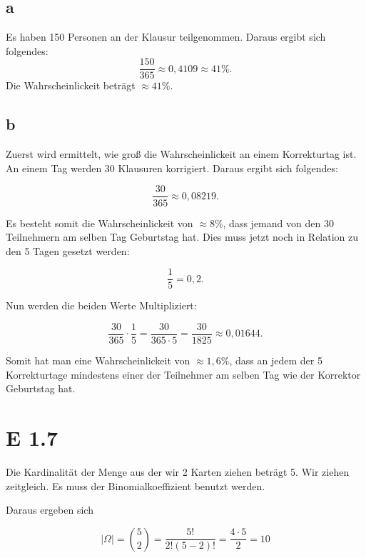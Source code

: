 \documentclass[12pt]{article}
\begin{document}
\subsection*{a}
Es haben 150 Personen an der Klausur teilgenommen. Daraus ergibt sich folgendes:
\begin{equation*}
\frac{150}{365} \approx 0,4109 \approx 41 \%.
\end{equation*}
Die Wahrscheinlickeit beträgt $\approx 41\%$.

\subsection*{b}
Zuerst wird ermittelt, wie groß die Wahrscheinlickeit an einem Korrekturtag ist. An einem Tag werden
30 Klausuren korrigiert. Daraus ergibt sich folgendes:

\begin{equation*}
\frac{30}{365} \approx 0,08219. 
\end{equation*}

Es besteht somit die Wahrscheinlickeit von $\approx 8\%$, dass jemand von den 30 Teilnehmern am
selben Tag Geburtstag hat. Dies muss jetzt noch in Relation zu den 5 Tagen gesetzt werden:

\begin{equation*}
\frac{1}{5} = 0,2.
\end{equation*}


Nun werden die beiden Werte Multipliziert:

\begin{equation*}
\frac{30}{365} \cdot \frac{1}{5} = \frac{30}{365 \cdot 5} = \frac{30}{1825} \approx 0,01644.
\end{equation*}

Somit hat man eine Wahrscheinlickeit von $\approx 1,6\%$, dass an jedem der 5 Korrekturtage mindestens
einer der Teilnehmer am selben Tag wie der Korrektor Geburtstag hat.

\section*{E 1.7}
Die Kardinalität der Menge aus der wir 2 Karten ziehen beträgt 5. Wir ziehen zeitgleich. Es muss der Binomialkoeffizient
benutzt werden.

Daraus ergeben sich

\begin{equation*}
|\Omega| = \binom{5}{2} = \frac{5!}{2!(5-2)!} = \frac{ 4 \cdot 5}{2} = 10
\end{equation*}
\end{document}
